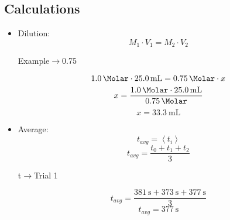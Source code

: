 \documentclass[a4paper]{article}
\def\mean#1{\left< #1 \right>}
\begin{document}
        \subsection{Calculations}
            \begin{itemize}
                \item Dilution:
                    \[M_{1} \cdot V_{1} = M_{2} \cdot V_{2}\]
                    \centerline{Example\(\to\)\SI{0.75}{\Molar}}
                    \[\SI{1.0}{\Molar} \cdot \SI{25.0}{\mL} = \SI{0.75}{\Molar} \cdot x\]
                    \[x=\frac{\SI{1.0}{\Molar} \cdot \SI{25.0}{\mL}}{\SI{0.75}{\Molar}}\]
                    \[x=\SI{33.3}{\mL}\]
                \item Average:
                    \[t_{avg}=\mean{t_{i}}\]
                    \[t_{avg}=\frac{t_{0}+t_{1}+t_{2}}{3}\]
                    \centerline{t\(\to\)Trial 1}
                    \[t_{avg}=\frac{\SI{381}{\s}+\SI{373}{\s}+\SI{377}{\s}}{3}\]
                    \[t_{avg}=\SI{377}{\s}\]
            \end{itemize}
\end{document}
